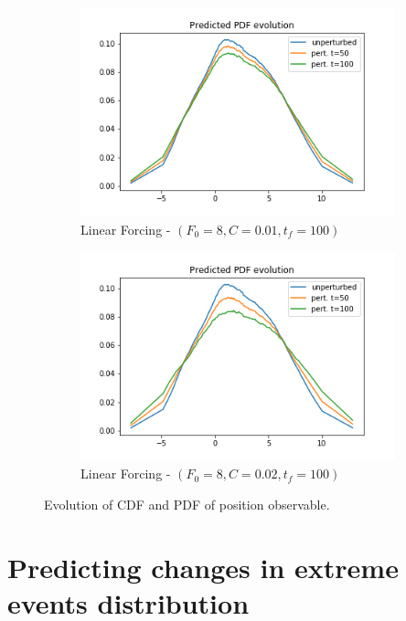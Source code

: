 \documentclass{article}
\begin{document}
\begin{figure}[!ht]
\begin{subfigure}[b]{0.48\textwidth}
		\includegraphics[width=1\linewidth]{fig/pred_pdf_position_below_L_001_100.png}
		\caption{Linear Forcing - $(F_0=8, C=0.01, t_f=100)$}
		\label{fig:pred_pdf_position_below_L_001_100}
	\end{subfigure}%
	\begin{subfigure}[b]{0.48\textwidth}
		\includegraphics[width=1\linewidth]{fig/pred_pdf_position_below_L_002_100.png}
		\caption{Linear Forcing - $(F_0=8, C=0.02, t_f=100)$}
		\label{fig:pred_pdf_position_below_L_001_200}
	\end{subfigure}
	\caption{Evolution of CDF and PDF of position observable.}
	\label{fig:pred_position_cdf_pdf}
\end{figure}

\section{Predicting changes in extreme events distribution} \label{section_LRT+EVT}
\end{document}
